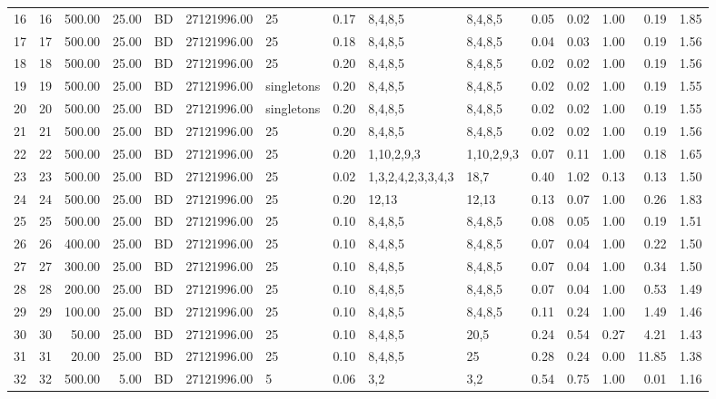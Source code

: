 \begin{table}[ht]
\begin{tabular}{rlrrlrlrllrrrrr}
  16 & 16 & 500.00 & 25.00 & BD & 27121996.00 & 25 & 0.17 & 8,4,8,5 & 8,4,8,5 & 0.05 & 0.02 & 1.00 & 0.19 & 1.85 \\ 
  17 & 17 & 500.00 & 25.00 & BD & 27121996.00 & 25 & 0.18 & 8,4,8,5 & 8,4,8,5 & 0.04 & 0.03 & 1.00 & 0.19 & 1.56 \\ 
  18 & 18 & 500.00 & 25.00 & BD & 27121996.00 & 25 & 0.20 & 8,4,8,5 & 8,4,8,5 & 0.02 & 0.02 & 1.00 & 0.19 & 1.56 \\ 
  19 & 19 & 500.00 & 25.00 & BD & 27121996.00 & singletons & 0.20 & 8,4,8,5 & 8,4,8,5 & 0.02 & 0.02 & 1.00 & 0.19 & 1.55 \\ 
  20 & 20 & 500.00 & 25.00 & BD & 27121996.00 & singletons & 0.20 & 8,4,8,5 & 8,4,8,5 & 0.02 & 0.02 & 1.00 & 0.19 & 1.55 \\ 
  21 & 21 & 500.00 & 25.00 & BD & 27121996.00 & 25 & 0.20 & 8,4,8,5 & 8,4,8,5 & 0.02 & 0.02 & 1.00 & 0.19 & 1.56 \\ 
  22 & 22 & 500.00 & 25.00 & BD & 27121996.00 & 25 & 0.20 & 1,10,2,9,3 & 1,10,2,9,3 & 0.07 & 0.11 & 1.00 & 0.18 & 1.65 \\ 
  23 & 23 & 500.00 & 25.00 & BD & 27121996.00 & 25 & 0.02 & 1,3,2,4,2,3,3,4,3 & 18,7 & 0.40 & 1.02 & 0.13 & 0.13 & 1.50 \\ 
  24 & 24 & 500.00 & 25.00 & BD & 27121996.00 & 25 & 0.20 & 12,13 & 12,13 & 0.13 & 0.07 & 1.00 & 0.26 & 1.83 \\ 
  25 & 25 & 500.00 & 25.00 & BD & 27121996.00 & 25 & 0.10 & 8,4,8,5 & 8,4,8,5 & 0.08 & 0.05 & 1.00 & 0.19 & 1.51 \\ 
  26 & 26 & 400.00 & 25.00 & BD & 27121996.00 & 25 & 0.10 & 8,4,8,5 & 8,4,8,5 & 0.07 & 0.04 & 1.00 & 0.22 & 1.50 \\ 
  27 & 27 & 300.00 & 25.00 & BD & 27121996.00 & 25 & 0.10 & 8,4,8,5 & 8,4,8,5 & 0.07 & 0.04 & 1.00 & 0.34 & 1.50 \\ 
  28 & 28 & 200.00 & 25.00 & BD & 27121996.00 & 25 & 0.10 & 8,4,8,5 & 8,4,8,5 & 0.07 & 0.04 & 1.00 & 0.53 & 1.49 \\ 
  29 & 29 & 100.00 & 25.00 & BD & 27121996.00 & 25 & 0.10 & 8,4,8,5 & 8,4,8,5 & 0.11 & 0.24 & 1.00 & 1.49 & 1.46 \\ 
  30 & 30 & 50.00 & 25.00 & BD & 27121996.00 & 25 & 0.10 & 8,4,8,5 & 20,5 & 0.24 & 0.54 & 0.27 & 4.21 & 1.43 \\ 
  31 & 31 & 20.00 & 25.00 & BD & 27121996.00 & 25 & 0.10 & 8,4,8,5 & 25 & 0.28 & 0.24 & 0.00 & 11.85 & 1.38 \\ 
  32 & 32 & 500.00 & 5.00 & BD & 27121996.00 & 5 & 0.06 & 3,2 & 3,2 & 0.54 & 0.75 & 1.00 & 0.01 & 1.16 \\ 

\end{tabular}
\end{table}
